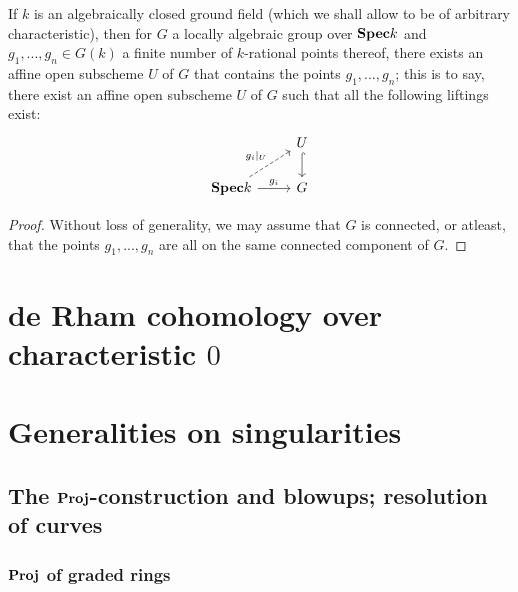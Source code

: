                \begin{proposition}
                    If $k$ is an algebraically closed ground field (which we shall allow to be of arbitrary characteristic), then for $G$ a locally algebraic group over $\mathbf{Spec} k$ and $g_1, ..., g_n \in G(k)$ a finite number of $k$-rational points thereof, there exists an affine open subscheme $U$ of $G$ that contains the points $g_1, ..., g_n$; this is to say, there exist an affine open subscheme $U$ of $G$ such that all the following liftings exist:
                        $$
                            \begin{tikzcd}
                            	& U \\
                            	{\Spec k} & G
                            	\arrow[hook, from=1-2, to=2-2]
                            	\arrow["{g_i}", from=2-1, to=2-2]
                            	\arrow["{g_i|_U}", dashed, from=2-1, to=1-2]
                            \end{tikzcd}
                        $$
                \end{proposition}
                    \begin{proof}
                        Without loss of generality, we may assume that $G$ is connected, or atleast, that the points $g_1, ..., g_n$ are all on the same connected component of $G$.   
                    \end{proof}
     
    \section{de Rham cohomology over characteristic \texorpdfstring{$0$}{}} \label{section: algebraic_de_rham_cohomology_over_characteristic_0}
    
    \section{Generalities on singularities}
        \subsection{The \texorpdfstring{$\mathbf{Proj}$}{}-construction and blowups; resolution of curves}
            \subsubsection{\texorpdfstring{$\mathbf{Proj}$}{} of graded rings}
            
